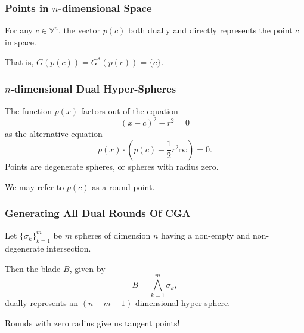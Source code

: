 \documentclass{beamer}
\newcommand{\V}{\mathbb{V}}
\newcommand{\nvai}{\infty}
\begin{document}
\begin{frame}
\frametitle{Points in $n$-dimensional Space}
For any $c\in\V^n$, the vector $p(c)$ both \alert{dually} and \alert{directly} represents the point $c$ in space.\pause

That is, $G(p(c)) = G^*(p(c)) = \{c\}$.
\end{frame}

\begin{frame}
\frametitle{$n$-dimensional \alert{Dual} Hyper-Spheres}
The function $p(x)$ factors out of the equation
\begin{equation*}
(x-c)^2 - r^2 = 0
\end{equation*}
as the alternative equation
\begin{equation*}
p(x)\cdot\left(p(c) - \frac{1}{2}r^2\nvai\right) = 0.
\end{equation*}\pause
Points are degenerate spheres, or spheres with radius zero.\pause

We may refer to $p(c)$ as a \alert{round} point.
\end{frame}

\begin{frame}
\frametitle{Generating All \alert{Dual Rounds} Of CGA}
Let $\{\sigma_k\}_{k=1}^m$ be $m$ spheres of dimension $n$ having a \alert{non-empty} and
\alert{non-degenerate} intersection.\pause

Then the blade $B$, given by
\begin{equation*}
B = \bigwedge_{k=1}^m\sigma_k,
\end{equation*}
\alert{dually} represents an $(n-m+1)$-dimensional hyper-sphere.\pause

\alert{Rounds} with zero radius give us \alert{tangent} points!
\end{frame}
\end{document}
